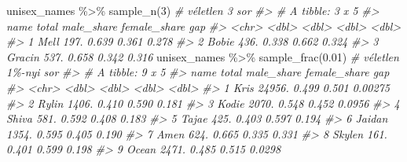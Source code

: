 \documentclass[
]{book}
\newenvironment{Shaded}{\begin{snugshade}}{\end{snugshade}}
\newcommand{\CommentTok}[1]{\textcolor[rgb]{0.56,0.35,0.01}{\textit{#1}}}
\newcommand{\DecValTok}[1]{\textcolor[rgb]{0.00,0.00,0.81}{#1}}
\newcommand{\FloatTok}[1]{\textcolor[rgb]{0.00,0.00,0.81}{#1}}
\newcommand{\FunctionTok}[1]{\textcolor[rgb]{0.00,0.00,0.00}{#1}}
\newcommand{\NormalTok}[1]{#1}
\newcommand{\SpecialCharTok}[1]{\textcolor[rgb]{0.00,0.00,0.00}{#1}}
\begin{document}
\begin{Shaded}
\begin{Highlighting}[]
\NormalTok{unisex\_names }\SpecialCharTok{\%\textgreater{}\%} \FunctionTok{sample\_n}\NormalTok{(}\DecValTok{3}\NormalTok{)        }\CommentTok{\# véletlen 3 sor}
\CommentTok{\#\textgreater{} \# A tibble: 3 x 5}
\CommentTok{\#\textgreater{}   name   total male\_share female\_share   gap}
\CommentTok{\#\textgreater{}   \textless{}chr\textgreater{}  \textless{}dbl\textgreater{}      \textless{}dbl\textgreater{}        \textless{}dbl\textgreater{} \textless{}dbl\textgreater{}}
\CommentTok{\#\textgreater{} 1 Mell    197.      0.639        0.361 0.278}
\CommentTok{\#\textgreater{} 2 Bobie   436.      0.338        0.662 0.324}
\CommentTok{\#\textgreater{} 3 Gracin  537.      0.658        0.342 0.316}
\NormalTok{unisex\_names }\SpecialCharTok{\%\textgreater{}\%} \FunctionTok{sample\_frac}\NormalTok{(}\FloatTok{0.01}\NormalTok{)  }\CommentTok{\# véletlen 1\%{-}nyi sor}
\CommentTok{\#\textgreater{} \# A tibble: 9 x 5}
\CommentTok{\#\textgreater{}   name    total male\_share female\_share     gap}
\CommentTok{\#\textgreater{}   \textless{}chr\textgreater{}   \textless{}dbl\textgreater{}      \textless{}dbl\textgreater{}        \textless{}dbl\textgreater{}   \textless{}dbl\textgreater{}}
\CommentTok{\#\textgreater{} 1 Kris   24956.      0.499        0.501 0.00275}
\CommentTok{\#\textgreater{} 2 Rylin   1406.      0.410        0.590 0.181  }
\CommentTok{\#\textgreater{} 3 Kodie   2070.      0.548        0.452 0.0956 }
\CommentTok{\#\textgreater{} 4 Shiva    581.      0.592        0.408 0.183  }
\CommentTok{\#\textgreater{} 5 Tajae    425.      0.403        0.597 0.194  }
\CommentTok{\#\textgreater{} 6 Jaidan  1354.      0.595        0.405 0.190  }
\CommentTok{\#\textgreater{} 7 Amen     624.      0.665        0.335 0.331  }
\CommentTok{\#\textgreater{} 8 Skylen   161.      0.401        0.599 0.198  }
\CommentTok{\#\textgreater{} 9 Ocean   2471.      0.485        0.515 0.0298}
\end{Highlighting}
\end{Shaded}
\end{document}

